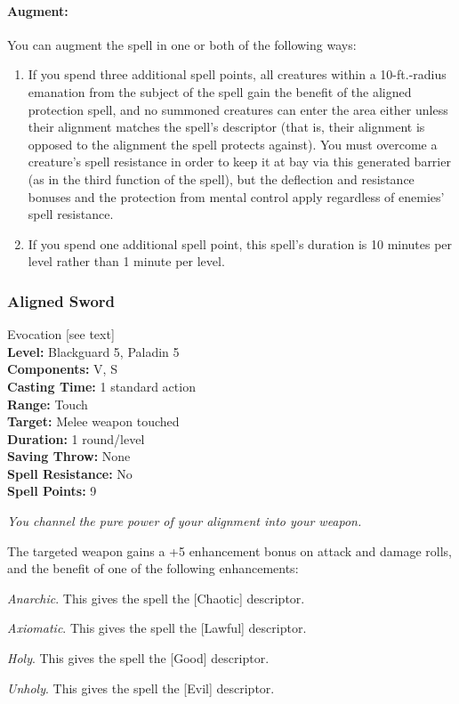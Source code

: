 \paragraph{Augment:} You can augment the spell in one or both of the following ways:
\begin{enumerate}
\item If you spend three additional spell points, all creatures within a 10-ft.-radius emanation from the subject of the spell
gain the benefit of the aligned protection spell, and no summoned creatures can enter the area either unless their alignment matches the spell's descriptor (that is, their alignment is opposed to the alignment the spell protects against). 
You must overcome a creature's spell resistance in order to keep it at bay via this generated barrier (as in the third function of the spell), but the deflection and resistance bonuses and the protection from mental control apply regardless of enemies' spell resistance.
\item If you spend one additional spell point, this spell's duration is 10 minutes per level rather than 1 minute per level.
\end{enumerate}
\subsubsection{Aligned Sword}
\label{Spell:AlignedSword}
Evocation [see text]
\\ \textbf{Level:} Blackguard 5, Paladin 5
\\ \textbf{Components:} V, S
\\ \textbf{Casting Time:} 1 standard action
\\ \textbf{Range:} Touch
\\ \textbf{Target:} Melee weapon touched
\\ \textbf{Duration:} 1 round/level
\\ \textbf{Saving Throw:} None
\\ \textbf{Spell Resistance:} No
\\ \textbf{Spell Points:} 9

\emph{You channel the pure power of your alignment into your weapon.}

The targeted weapon gains a +5 enhancement bonus on attack and damage rolls, and the benefit of one of the following enhancements:
\begin{list}{}{\leftmargin=1em}
 \item \emph{Anarchic}. This gives the spell the [Chaotic] descriptor.
 \item \emph{Axiomatic}. This gives the spell the [Lawful] descriptor.
 \item \emph{Holy}. This gives the spell the [Good] descriptor.
 \item \emph{Unholy}. This gives the spell the [Evil] descriptor.
\end{list}

